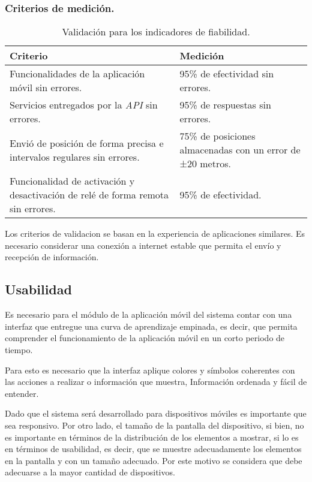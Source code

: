 \subsubsection{Criterios de medición.}

\begin{table}[H]
    \caption[Validación para los indicadores de fiabilidad.] {Validación para los indicadores de fiabilidad.}
    \label{tbl:Criterios de Validación fiabilidad}
    \begin{tabular}{|p{}|p{}|}
        \hline
        \textbf{Criterio} &  \textbf{Medición}\\
    	\hline
    	\hline
    	Funcionalidades de la aplicación móvil sin errores. & 95\% de efectividad sin errores. \\ \hline
		Servicios entregados por la \emph{API} sin errores. & 95\% de respuestas sin errores. \\ \hline
		Envió de posición de forma precisa e intervalos regulares sin errores. & 75\% de posiciones almacenadas con un error de ±20 metros. \\ \hline
		Funcionalidad de activación y desactivación de relé de forma remota sin errores. & 95\% de efectividad. \\
        \hline
    \end{tabular}
\end{table}

Los criterios de validacion se basan en la experiencia de aplicaciones similares. Es necesario considerar una conexión a internet estable que permita el envío y recepción de información.

\subsection{Usabilidad}

Es necesario para el módulo de la aplicación móvil del sistema contar con una interfaz que entregue una curva de aprendizaje empinada, es decir, que permita comprender el funcionamiento de la aplicación móvil en un corto periodo de tiempo.

Para esto es necesario que la interfaz aplique colores y símbolos coherentes con las acciones a realizar o información que muestra, Información ordenada y fácil de entender.

Dado que el sistema será desarrollado para dispositivos móviles es importante que sea responsivo. Por otro lado, el tamaño de la pantalla del dispositivo, si bien, no es importante en términos de la distribución de los elementos a mostrar, si lo es en términos de usabilidad, es decir, que se muestre adecuadamente los elementos en la pantalla y con un tamaño adecuado. Por este motivo se considera que debe adecuarse a la mayor cantidad de dispositivos.

